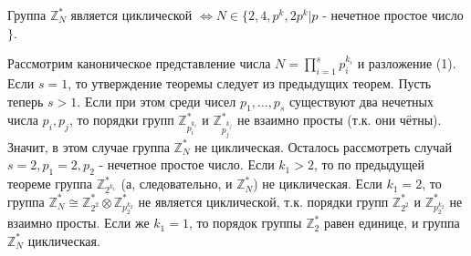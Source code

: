 \begin{proofs}
	Группа $\mathbb{Z}_{N}^{*}$ является циклической $\Leftrightarrow N \in  \{2,4,p^{k}, 2p^{k}|p$ - нечетное простое число$\}$.
	\begin{dokvo}
		Рассмотрим каноническое представление числа $N = \prod_{i=1}^{s}p_{i}^{k_{i}}$ и разложение (1). Если $s = 1$, то утверждение теоремы следует из предыдущих теорем.
		Пусть теперь $s>1$. Если при этом среди чисел $p_{1},\dots,p_{s}$ существуют два нечетных числа $p_{i}, p_{j}$, то порядки групп $\mathbb{Z}_{p^{k_{i}}_{i}}^{*}$ и $\mathbb{Z}_{p^{k_{j}}_{j}}^{*}$ не взаимно просты (т.к. они чётны). Значит, в этом случае группа $\mathbb{Z}_{N}^{*}$ не циклическая.
		Осталось рассмотреть случай $s=2, p_{1}=2, p_{2}$ - нечетное простое число. Если $k_{1}>2$, то по предыдущей теореме группа $\mathbb{Z}_{2^{k_{1}}}^{*}$ (а, следовательно, и $\mathbb{Z}_{N}^{*}$) не циклическая.
		Если $k_{1}=2$, то группа $\mathbb{Z}_{N}^{*} \cong \mathbb{Z}_{2^{2}}^{*} \otimes \mathbb{Z}_{p_{2}^{k_{2}}}^{*}$ не является циклической, т.к. порядки групп $\mathbb{Z}_{2^{2}}^{*}$ и $\mathbb{Z}_{p_{2}^{k_{2}}}^{*}$ не взаимно просты. Если же $k_{1} = 1$, то порядок группы $\mathbb{Z}_{2}^{*}$ равен единице, и группа $\mathbb{Z}_{N}^{*}$ циклическая.
	\end{dokvo}
\end{proofs}